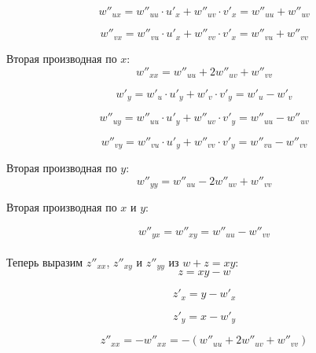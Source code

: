 \documentclass[a5paper, 10pt]{article}
\theoremstyle{definition}
\theoremstyle{plain}
\theoremstyle{remark}
\begin{document}
\begin{equation}
w''_{ux}  = w''_{uu} \cdot u'_x + w''_{uv} \cdot v'_x = w''_{uu} + w''_{uv}
\end{equation}

\begin{equation}
w''_{vx}  = w''_{vu} \cdot u'_x + w''_{vv} \cdot v'_x = w''_{vu} + w''_{vv}
\end{equation}

Вторая производная по  $x$:
\begin{equation}
w''_{xx} = w''_{uu} + 2w''_{uv} + w''_{vv}
\end{equation}


\begin{equation}
w'_y = w'_u \cdot u'_y + w'_v \cdot v'_y = w'_u - w'_v
\end{equation}

\begin{equation}
w''_{uy}  = w''_{uu} \cdot u'_y + w''_{uv} \cdot v'_y = w''_{uu} - w''_{uv}
\end{equation}

\begin{equation}
w''_{vy}  = w''_{vu} \cdot u'_y + w''_{vv} \cdot v'_y = w''_{vu} - w''_{vv}
\end{equation}

 Вторая производная по $y$:
\begin{equation}
w''_{yy} = w''_{uu} - 2w''_{uv} + w''_{vv}
\end{equation}

Вторая производная по  $x$ и $y$:

\begin{equation}
w''_{yx} = w''_{xy} =  w''_{uu} -  w''_{vv}
\end{equation}
\\
Теперь выразим $z''_{xx}$,  $z''_{xy}$ и $z''_{yy}$ из $w + z = xy$:
\begin{equation}
z = xy - w
\end{equation}

\begin{equation}
z'_x = y - w'_x
\end{equation}

\begin{equation}
z'_y = x - w'_y
\end{equation}

\begin{equation}
z''_{xx} = - w''_{xx} = - ( w''_{uu} + 2w''_{uv} + w''_{vv})
\end{equation}
\end{document}
